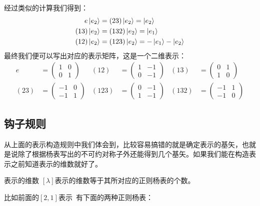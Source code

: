 经过类似的计算我们得到：
\begin{equation}
	\begin{aligned}
		e\ket{e_2}&=(23)\ket{e_2}=\ket{e_2}\\
		(13)\ket{e_2}&=(132)\ket{e_2}=\ket{e_1}\\
		(12)\ket{e_2}&=(123)\ket{e_2}=-\ket{e_1}-\ket{e_2}
	\end{aligned}
\end{equation}
最终我们便可以写出对应的表示矩阵，这是一个二维表示：
\begin{equation}
	\begin{aligned}
		e& = \begin{pmatrix}
			1&0 \\
			0&1
		\end{pmatrix}&(12)&=\begin{pmatrix}
			1&-1 \\
			0&-1
		\end{pmatrix}&(13)&=\begin{pmatrix}
			0&1 \\
			1&0
		\end{pmatrix}\\
		(23)&=\begin{pmatrix}
			-1&0 \\
			-1&1
		\end{pmatrix}&(123)&=\begin{pmatrix}
			0&-1 \\
			1&-1
		\end{pmatrix}&(132)&=\begin{pmatrix}
			-1&1 \\
			-1&0
		\end{pmatrix}
	\end{aligned}
\end{equation}
\subsection{钩子规则}
从上面的表示构造规则中我们体会到，比较容易搞错的就是确定表示的基矢，也就是说除了根据杨表写出的不可约对称子外还能得到几个基矢。如果我们能在构造表示之前知道表示的维数就好了。
\begin{theorem}{表示的维数}
	$[\lambda]$表示的维数等于其所对应的正则杨表的个数。
\end{theorem}
比如前面的$[2,1]$表示{\ }有下面的两种正则杨表：

\begin{center}
	\qquad {}
\end{center}

